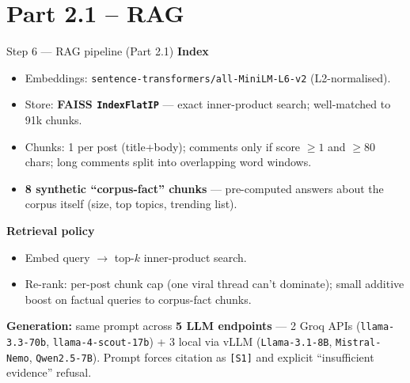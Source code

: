\documentclass[10pt,aspectratio=169]{beamer}
\begin{document}
\section{Part 2.1 -- RAG}

\begin{frame}{Step 6 — RAG pipeline (Part 2.1)}
\textbf{Index}
\begin{itemize}
  \item Embeddings: \texttt{sentence-transformers/all-MiniLM-L6-v2} (L2-normalised).
  \item Store: \textbf{FAISS \texttt{IndexFlatIP}} — exact inner-product search; well-matched to 91k chunks.
  \item Chunks: 1 per post (title+body); comments only if score $\geq 1$ and $\geq 80$ chars; long comments split into overlapping word windows.
  \item \textbf{8 synthetic ``corpus-fact'' chunks} — pre-computed answers about the corpus itself (size, top topics, trending list).
\end{itemize}

\medskip
\textbf{Retrieval policy}
\begin{itemize}
  \item Embed query $\to$ top-$k$ inner-product search.
  \item Re-rank: per-post chunk cap (one viral thread can't dominate); small additive boost on factual queries to corpus-fact chunks.
\end{itemize}

\medskip
\textbf{Generation:} same prompt across \textbf{5 LLM endpoints} — 2 Groq APIs (\texttt{llama-3.3-70b}, \texttt{llama-4-scout-17b}) + 3 local via vLLM (\texttt{Llama-3.1-8B}, \texttt{Mistral-Nemo}, \texttt{Qwen2.5-7B}). Prompt forces citation as \texttt{[S1]} and explicit ``insufficient evidence'' refusal.
\end{frame}
\end{document}
